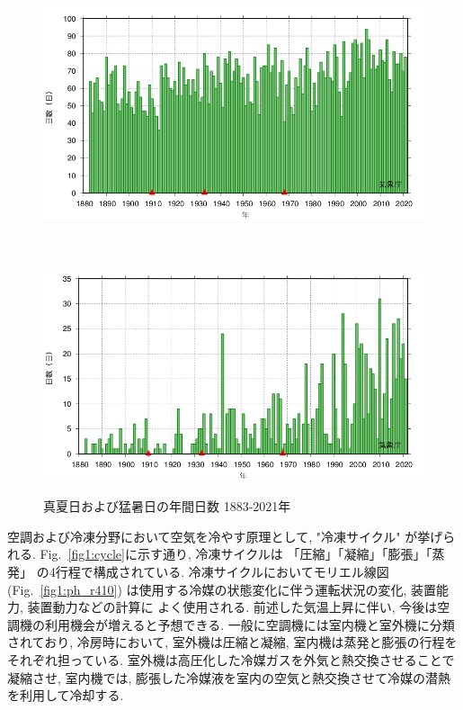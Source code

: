 \documentclass[a4j,fleqn,dvipdfmx,uplatex]{jsarticle}
\newcommand{\figref}[1]{Fig.\ \ref{#1}}
\begin{document}
\begin{figure}[htb]
  \centering
  \begin{minipage}[b]{\linewidth}
      \centering
      \includegraphics[width=\linewidth]{img/OSAKA_tmaxGE30.png}
      \label{subfig1:temp_osaka}
    \end{minipage}\\
    \begin{minipage}[b]{\linewidth}
      \centering
      \includegraphics[width=\linewidth]{img/OSAKA_tmaxGE35.png}
      \label{subfig1:temp_osaka2}
    \end{minipage}
    \caption{真夏日および猛暑日の年間日数 1883-2021年\cite{temp_osaka3}}
    \label{fig1:temp_osaka}
\end{figure}
 

空調および冷凍分野において空気を冷やす原理として, "冷凍サイクル" が挙げられる. 
\figref{fig1:cycle}に示す通り, 冷凍サイクルは 「圧縮」「凝縮」「膨張」「蒸発」 
の4行程で構成されている. 冷凍サイクルにおいてモリエル線図(\figref{fig1:ph_r410}) 
は使用する冷媒の状態変化に伴う運転状況の変化, 装置能力, 装置動力などの計算に
よく使用される. 
前述した気温上昇に伴い, 今後は空調機の利用機会が増えると予想できる. 
一般に空調機には室内機と室外機に分類されており, 
冷房時において, 室外機は圧縮と凝縮, 室内機は蒸発と膨張の行程をそれぞれ担っている. 
室外機は高圧化した冷媒ガスを外気と熱交換させることで凝縮させ, 
室内機では, 膨張した冷媒液を室内の空気と熱交換させて冷媒の潜熱を利用して冷却する. 
\end{document}
